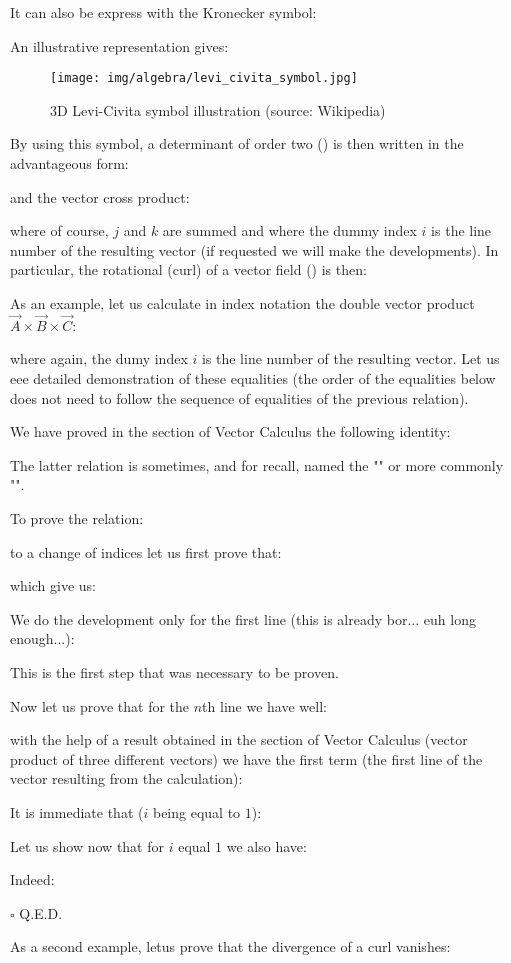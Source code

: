 	It can also be express with the Kronecker symbol:
	
	
	An illustrative representation gives:
	\begin{figure}[H]
		\centering
		\texttt{[image: img/algebra/levi\_civita\_symbol.jpg]}
		\caption[3D Levi-Civita symbol illustration]{3D Levi-Civita symbol illustration (source: Wikipedia)}
	\end{figure}
	By using this symbol, a determinant of order two () is then written in the advantageous form:
	
	and the vector cross product:
	
	where of course, $j$ and $k$ are summed and where the dummy index $i$ is the line number of the resulting vector (if requested we will make the developments). In particular, the rotational (curl) of a vector field () is then:
	   
	As an example, let us calculate in index notation the double vector product $\vec{A}\times\vec{B}\times\vec{C}$:
	 
	where again, the dumy index $i$ is the line number of the resulting vector. Let us eee detailed demonstration of these equalities (the order of the equalities below does not need to follow the sequence of equalities of the previous relation).
	\begin{dem}
	We have proved in the section of Vector Calculus the following identity:
	
	\begin{tcolorbox}[title=Remark,colframe=black,arc=10pt]
	The latter relation is sometimes, and for recall, named the "" or more commonly "".
	\end{tcolorbox}	
	To prove the relation:
	
	to a change of indices let us first prove that:
	
	which give us:
	
	We do the development only for the first line (this is already bor... euh long enough...):
	
	This is the first step that was necessary to be proven.
	
	Now let us prove that for the $n$th line we have well:
	
	with the help of a result obtained in the section of Vector Calculus (vector product of three different vectors) we have the first term (the first line of the vector resulting from the calculation):
	
	It is immediate that ($i$ being equal to $1$):
	
	Let us show now that for $i$ equal $1$ we also have:
	
	Indeed:
	
	\begin{flushright}
		$\square$  Q.E.D.
	\end{flushright}
	\end{dem}
	As a second example, letus prove that the divergence of a curl vanishes:
	
